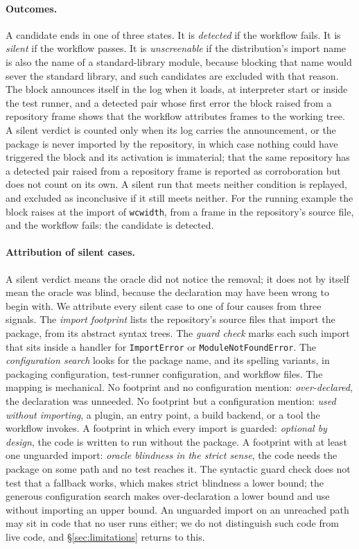 \documentclass[11pt]{article}
\newcommand{\code}[1]{\texttt{\small #1}}
\begin{document}
\paragraph{Outcomes.}
A candidate ends in one of three states.
It is \emph{detected} if the workflow fails.
It is \emph{silent} if the workflow passes.
It is \emph{unscreenable} if the distribution's import name is also the name of a standard-library module, because blocking that name would sever the standard library, and such candidates are excluded with that reason.
The block announces itself in the log when it loads, at interpreter start or inside the test runner, and a detected pair whose first error the block raised from a repository frame shows that the workflow attributes frames to the working tree.
A silent verdict is counted only when its log carries the announcement, or the package is never imported by the repository, in which case nothing could have triggered the block and its activation is immaterial; that the same repository has a detected pair raised from a repository frame is reported as corroboration but does not count on its own.
A silent run that meets neither condition is replayed, and excluded as inconclusive if it still meets neither.
For the running example the block raises at the import of \code{wcwidth}, from a frame in the repository's source file, and the workflow fails: the candidate is detected.

\paragraph{Attribution of silent cases.}
A silent verdict means the oracle did not notice the removal; it does not by itself mean the oracle was blind, because the declaration may have been wrong to begin with.
We attribute every silent case to one of four causes from three signals.
The \emph{import footprint} lists the repository's source files that import the package, from its abstract syntax trees.
The \emph{guard check} marks each such import that sits inside a handler for \code{ImportError} or \code{ModuleNotFoundError}.
The \emph{configuration search} looks for the package name, and its spelling variants, in packaging configuration, test-runner configuration, and workflow files.
The mapping is mechanical.
No footprint and no configuration mention: \emph{over-declared}, the declaration was unneeded.
No footprint but a configuration mention: \emph{used without importing}, a plugin, an entry point, a build backend, or a tool the workflow invokes.
A footprint in which every import is guarded: \emph{optional by design}, the code is written to run without the package.
A footprint with at least one unguarded import: \emph{oracle blindness in the strict sense}, the code needs the package on some path and no test reaches it.
The syntactic guard check does not test that a fallback works, which makes strict blindness a lower bound; the generous configuration search makes over-declaration a lower bound and use without importing an upper bound.
An unguarded import on an unreached path may sit in code that no user runs either; we do not distinguish such code from live code, and \S\ref{sec:limitations} returns to this.
\end{document}
